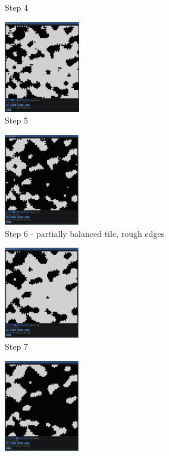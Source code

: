\documentclass[12pt]{report}
\begin{document}
\begin{figure}[ht!]
\begin{subfigure}[t]{0.3\textwidth}
		\caption{Step 4} 
	\end{subfigure} \hspace{1em}
	\begin{subfigure}[t]{0.3\textwidth}
		\centering
		\includegraphics[height=4cm]{images/s_5}
		\caption{Step 5} 
	\end{subfigure} \hspace{1em}
	\begin{subfigure}[t]{0.3\textwidth}
		\centering
		\includegraphics[height=4cm]{images/s_6}
		\caption{Step 6 - partially balanced tile, rough edges} 
	\end{subfigure} \hspace{1em}
	\begin{subfigure}[t]{0.3\textwidth}
		\centering
		\includegraphics[height=4cm]{images/s_7}
		\caption{Step 7} 
	\end{subfigure} \hspace{1em}
	\begin{subfigure}[t]{0.3\textwidth}
		\centering
		\includegraphics[height=4cm]{images/s_8}

\end{subfigure}
\end{figure}
\end{document}
